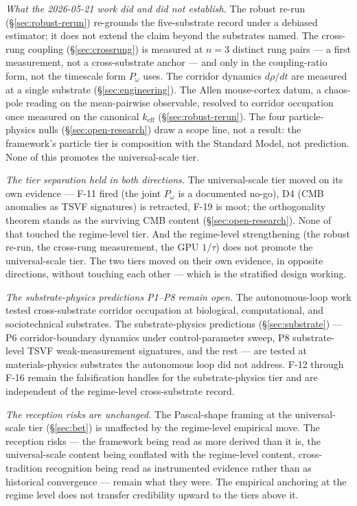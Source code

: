 \documentclass[11pt,a4paper]{article}
\newcommand{\keff}{k_{\text{eff}}}
\newcommand{\Pomega}{P_{\omega}}
\begin{document}
\emph{What the 2026-05-21 work did and did not establish.} The robust re-run (\S\ref{sec:robust-rerun}) re-grounds the five-substrate record under a debiased estimator; it does not extend the claim beyond the substrates named. The cross-rung coupling (\S\ref{sec:crossrung}) is measured at $n = 3$ distinct rung pairs --- a first measurement, not a cross-substrate anchor --- and only in the coupling-ratio form, not the timescale form $\Pomega$ uses. The corridor dynamics $d\rho/dt$ are measured at a single substrate (\S\ref{sec:engineering}). The Allen mouse-cortex datum, a chaos-pole reading on the mean-pairwise observable, resolved to corridor occupation once measured on the canonical $\keff$ (\S\ref{sec:robust-rerun}). The four particle-physics nulls (\S\ref{sec:open-research}) draw a scope line, not a result: the framework's particle tier is composition with the Standard Model, not prediction. None of this promotes the universal-scale tier.


\emph{The tier separation held in both directions.} The universal-scale tier moved on its own evidence --- F-11 fired (the joint $\Pomega$ is a documented no-go), D4 (CMB anomalies as TSVF signatures) is retracted, F-19 is moot; the orthogonality theorem stands as the surviving CMB content (\S\ref{sec:open-research}). None of that touched the regime-level tier. And the regime-level strengthening (the robust re-run, the cross-rung measurement, the GPU $1/\tau$) does not promote the universal-scale tier. The two tiers moved on their own evidence, in opposite directions, without touching each other --- which is the stratified design working.

\emph{The substrate-physics predictions P1--P8 remain open.} The autonomous-loop work tested cross-substrate corridor occupation at biological, computational, and sociotechnical substrates. The substrate-physics predictions (\S\ref{sec:substrate}) --- P6 corridor-boundary dynamics under control-parameter sweep, P8 substrate-level TSVF weak-measurement signatures, and the rest --- are tested at materials-physics substrates the autonomous loop did not address. F-12 through F-16 remain the falsification handles for the substrate-physics tier and are independent of the regime-level cross-substrate record.

\emph{The reception risks are unchanged.} The Pascal-shape framing at the universal-scale tier (\S\ref{sec:bet}) is unaffected by the regime-level empirical move. The reception risks --- the framework being read as more derived than it is, the universal-scale content being conflated with the regime-level content, cross-tradition recognition being read as instrumented evidence rather than as historical convergence --- remain what they were. The empirical anchoring at the regime level does not transfer credibility upward to the tiers above it.
\end{document}

